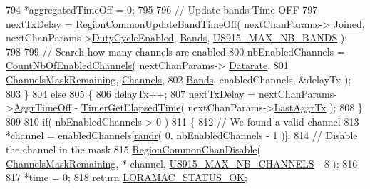 \begin{DoxyCode}
794         *aggregatedTimeOff = 0;
795 
796         \textcolor{comment}{// Update bands Time OFF}
797         nextTxDelay = \mbox{\hyperlink{group___r_e_g_i_o_n_c_o_m_m_o_n_ga2e26fe6b49ca26edf7052eadd7f18b3a}{RegionCommonUpdateBandTimeOff}}( nextChanParams->
      \mbox{\hyperlink{structs_next_chan_params_ac2f6caa0f3b02d2ac5056c3ee7c22652}{Joined}}, nextChanParams->\mbox{\hyperlink{structs_next_chan_params_a4d755868e0e80089462286c3ba6a6f18}{DutyCycleEnabled}}, \mbox{\hyperlink{_region_u_s915_8c_a04e3e1a4af677cf4f4b64c1335e07dd0}{Bands}}, 
      \mbox{\hyperlink{group___r_e_g_i_o_n_u_s915_ga85b21b9c0af1bca8fb301bedf0be8fb7}{US915\_MAX\_NB\_BANDS}} );
798 
799         \textcolor{comment}{// Search how many channels are enabled}
800         nbEnabledChannels = \mbox{\hyperlink{_region_u_s915_8c_a43fc7f3f4d15301eebe5c4a8b64b3f51}{CountNbOfEnabledChannels}}( nextChanParams->
      \mbox{\hyperlink{structs_next_chan_params_ae2f6080f3aa0e9485c55513ca56bb24d}{Datarate}},
801                                                       \mbox{\hyperlink{_region_u_s915_8c_a567333cec639a004655cc1717e9d0928}{ChannelsMaskRemaining}}, 
      \mbox{\hyperlink{_region_u_s915_8c_a83f8d040b2c69b3b4ed9ff970b0efcfb}{Channels}},
802                                                       \mbox{\hyperlink{_region_u_s915_8c_a04e3e1a4af677cf4f4b64c1335e07dd0}{Bands}}, enabledChannels, &delayTx );
803     \}
804     \textcolor{keywordflow}{else}
805     \{
806         delayTx++;
807         nextTxDelay = nextChanParams->\mbox{\hyperlink{structs_next_chan_params_a3609676d2d3b7c00e25615324b35cb26}{AggrTimeOff}} - 
      \mbox{\hyperlink{time_server_8c_a9ca7e27f3d6474daff63f2e093a2e91e}{TimerGetElapsedTime}}( nextChanParams->\mbox{\hyperlink{structs_next_chan_params_a381b728f60b185ecf3313e974c18768b}{LastAggrTx}} );
808     \}
809 
810     \textcolor{keywordflow}{if}( nbEnabledChannels > 0 )
811     \{
812         \textcolor{comment}{// We found a valid channel}
813         *channel = enabledChannels[\mbox{\hyperlink{utilities_8c_af5d8ad6dae489ac64821e7d4f004595d}{randr}}( 0, nbEnabledChannels - 1 )];
814         \textcolor{comment}{// Disable the channel in the mask}
815         \mbox{\hyperlink{group___r_e_g_i_o_n_c_o_m_m_o_n_ga695c0ab2a06edcae5b33772f639fb676}{RegionCommonChanDisable}}( \mbox{\hyperlink{_region_u_s915_8c_a567333cec639a004655cc1717e9d0928}{ChannelsMaskRemaining}}, *
      channel, \mbox{\hyperlink{group___r_e_g_i_o_n_u_s915_ga417ab6531cbaef476634d7ba0b04c20f}{US915\_MAX\_NB\_CHANNELS}} - 8 );
816 
817         *time = 0;
818         \textcolor{keywordflow}{return} \mbox{\hyperlink{group___l_o_r_a_m_a_c_gga1d18f26b344040b3ec5c3db662919661a03db5fca052313edb3823c014b653a74}{LORAMAC\_STATUS\_OK}};

\end{DoxyCode}
